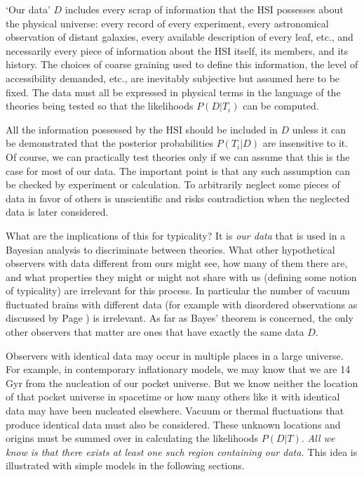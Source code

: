 \documentclass[pra,floatfix,preprint,nofootinbib,12pt]{revtex4}
\begin{document}
 `Our data'  $D$ includes every scrap of information that the HSI possesses about the physical universe: every record of every experiment, every astronomical observation of distant galaxies, every available description of every leaf, etc., and necessarily every piece of information about the HSI itself, its members, and its history. The choices of coarse graining used to define this information, the level of accessibility demanded, etc., are inevitably subjective but assumed here to be fixed.  The data must all be expressed in physical terms in the language of the theories being tested so that the likelihoods $P(D|T_i)$ can be computed. 

All the information  possessed by the HSI should be included in $D$ unless it can be demonstrated that the posterior probabilities $P(T_i|D)$ are insensitive to it. Of course, we can practically test theories only if we can assume that this is the case for most of our data. The important point is that any such assumption can be checked by experiment or calculation. To arbitrarily neglect some pieces of data in favor of others is unscientific and risks contradiction when the neglected data is later considered. 

What are the implications of this for typicality?  It is {\it our data} that is used in a Bayesian analysis to discriminate between theories. What other hypothetical observers with data different from ours might see, how many of them there are, and what properties they might or might not share with us (defining some notion of typicality) are irrelevant for this process. In particular the number of vacuum fluctuated brains with different data (for example with disordered observations as discussed by Page \cite{Page06a, Page06b}) is irrelevant. As far as Bayes' theorem is concerned, the only other observers that matter are ones that have exactly the same data $D$.  

Observers with identical data may occur in multiple places in a large universe.  For example, in contemporary inflationary models, we may know that we are 14$\,$Gyr from the nucleation of our pocket universe. But we know neither the location of that pocket universe in spacetime or how many others like it with identical data may have been nucleated elsewhere. Vacuum or thermal fluctuations that produce identical data must also be considered. These unknown locations and origins must be summed over in calculating the likelihoods $P(D|T)$. {\it All we know is that there exists at least one such region containing our data.}  This idea is illustrated with simple models in the following sections. 
\end{document}
